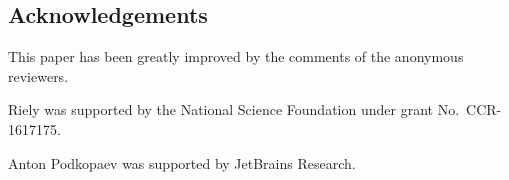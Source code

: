 










\subsection*{Acknowledgements}
This paper has been greatly improved by the comments of the anonymous reviewers.

Riely was supported by the National Science Foundation under
grant No.~CCR-1617175.



Anton Podkopaev was supported by JetBrains Research.


